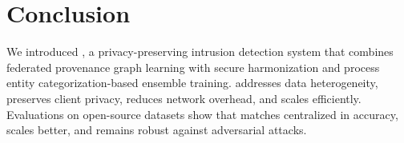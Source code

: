 \section{Conclusion}
\label{sec:conclusion}

We introduced \Sys, a privacy-preserving intrusion detection system that combines federated provenance graph learning with secure \wordvec harmonization and process entity categorization-based \gnnshort ensemble training. \Sys addresses data heterogeneity, preserves client privacy, reduces network overhead, and scales efficiently. Evaluations on open-source datasets show that \Sys matches centralized \pids in accuracy, scales better, and remains robust against adversarial attacks. %